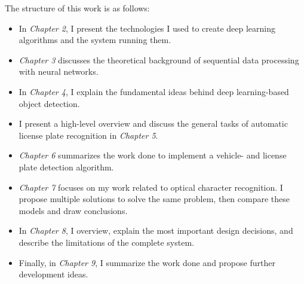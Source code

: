 \newpage
The structure of this work is as follows:

\begin{itemize}
\item In \textit{Chapter 2}, I present the technologies I used to create deep learning algorithms and the system running them.
\item \textit{Chapter 3} discusses the theoretical background of sequential data processing with neural networks.
\item In \textit{Chapter 4}, I explain the fundamental ideas behind deep learning-based object detection.
\item I present a high-level overview and discuss the general tasks of automatic license plate recognition in \textit{Chapter 5}.
\item \textit{Chapter 6} summarizes the work done to implement a vehicle- and license plate detection algorithm.
\item \textit{Chapter 7} focuses on my work related to optical character recognition. I propose multiple solutions to solve the same problem, then compare these models and draw conclusions.
\item In \textit{Chapter 8}, I overview, explain the most important design decisions, and describe the limitations of the complete system.
\item Finally, in \textit{Chapter 9}, I summarize the work done and propose further development ideas.
\end{itemize}
